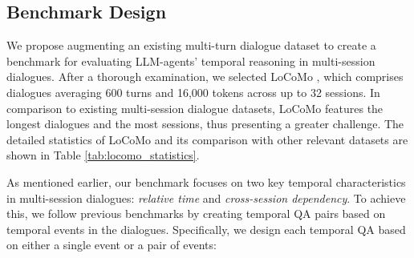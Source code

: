 \begin{table*}[ht]
\small
\centering
{}
\caption{Dataset statistics and details of the constructed benchmark.\textit{$\#$ of Options} refers to the number of options for each temporal question. \textit{$\#$ of Events} refers to the number of selected events to create each temporal question. \textit{Event Type} specifies the type of temporal events chosen for question creation, where \textit{(+ relative time)} indicates that relative time was an additional consideration in event selection.  Note that our benchmark not only contains more temporal QAs than LoCoMo, but also include unanswerable questions.}
\label{tab:statistics}
\vspace{-0.5cm}
\end{table*}

\subsection{Benchmark Design}
We propose augmenting an existing multi-turn dialogue dataset to create a benchmark for evaluating LLM-agents' temporal reasoning in multi-session dialogues. After a thorough examination, we selected LoCoMo \cite{maharana-etal-2024-evaluating}, which comprises dialogues averaging 600 turns and 16,000 tokens across up to 32 sessions. In comparison to existing multi-session dialogue datasets, LoCoMo features the longest dialogues and the most sessions, thus presenting a greater challenge. The detailed statistics of LoCoMo and its comparison with other relevant datasets are shown in Table \ref{tab:locomo_statistics}.

As mentioned earlier, our benchmark focuses on two key temporal characteristics in multi-session dialogues: \textit{relative time} and \textit{cross-session dependency}. To achieve this, we follow previous benchmarks \cite{chen2dataset,xiong-etal-2024-large,wang-zhao-2024-tram} by creating temporal QA pairs based on temporal events in the dialogues. Specifically, we design each temporal QA based on either a single event or a pair of events:

